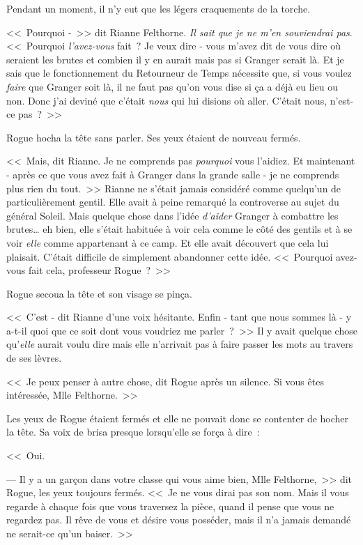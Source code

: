 Pendant un moment, il n'y eut que les légers craquements de la torche.

<<~Pourquoi -~>> dit Rianne Felthorne. \emph{Il sait que je ne m'en souviendrai pas}. <<~Pourquoi \emph{l'avez-vous} fait~? Je veux dire - vous m'avez dit de vous dire où seraient les brutes et combien il y en aurait mais pas si Granger serait là. Et je sais que le fonctionnement du Retourneur de Temps nécessite que, si vous voulez \emph{faire} que Granger soit là, il ne faut pas qu'on vous dise si ça a déjà eu lieu ou non. Donc j'ai deviné que c'était \emph{nous} qui lui disions où aller. C'était nous, n'est-ce pas~?~>>

Rogue hocha la tête sans parler. Ses yeux étaient de nouveau fermés.

<<~Mais, dit Rianne. Je ne comprends pas \emph{pourquoi} vous l'aidiez. Et maintenant - après ce que vous avez fait à Granger dans la grande salle - je ne comprends plus rien du tout.~>> Rianne ne s'était jamais considéré comme quelqu'un de particulièrement gentil. Elle avait à peine remarqué la controverse au sujet du général Soleil. Mais quelque chose dans l'idée \emph{d'aider} Granger à combattre les brutes… eh bien, elle s'était habituée à voir cela comme le côté des gentils et à se voir \emph{elle} comme appartenant à ce camp. Et elle avait découvert que cela lui plaisait. C'était difficile de simplement abandonner cette idée. <<~Pourquoi avez-vous fait cela, professeur Rogue~?~>>

Rogue secoua la tête et son visage se pinça.

<<~C'est - dit Rianne d'une voix hésitante. Enfin - tant que nous sommes là - y a-t-il quoi que ce soit dont vous voudriez me parler~?~>> Il y avait quelque chose qu'\emph{elle} aurait voulu dire mais elle n'arrivait pas à faire passer les mots au travers de ses lèvres.

<<~Je peux penser à autre chose, dit Rogue après un silence. Si vous êtes intéressée, Mlle Felthorne.~>>

Les yeux de Rogue étaient fermés et elle ne pouvait donc se contenter de hocher la tête. Sa voix de brisa presque lorsqu'elle se força à dire~:

<<~Oui.

--- Il y a un garçon dans votre classe qui vous aime bien, Mlle Felthorne,~>> dit Rogue, les yeux toujours fermés. <<~Je ne vous dirai pas son nom. Mais il vous regarde à chaque fois que vous traversez la pièce, quand il pense que vous ne regardez pas. Il rêve de vous et désire vous posséder, mais il n'a jamais demandé ne serait-ce qu'un baiser.~>>

